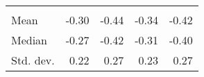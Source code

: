 \begin{tabular}{lllll}
  \multicolumn{1}{|r}{} &
  \multicolumn{1}{r}{} &
  \multicolumn{1}{r}{} &
  \multicolumn{1}{r}{} \\
\multicolumn{1}{l}{\hspace{2em}Mean} &
  \multicolumn{1}{|r}{-0.30} &
  \multicolumn{1}{r}{-0.44} &
  \multicolumn{1}{r}{-0.34} &
  \multicolumn{1}{r}{-0.42} \\
\multicolumn{1}{l}{\hspace{2em}Median} &
  \multicolumn{1}{|r}{-0.27} &
  \multicolumn{1}{r}{-0.42} &
  \multicolumn{1}{r}{-0.31} &
  \multicolumn{1}{r}{-0.40} \\
\multicolumn{1}{l}{\hspace{2em}Std. dev.} &
  \multicolumn{1}{|r}{0.22} &
  \multicolumn{1}{r}{0.27} &
  \multicolumn{1}{r}{0.23} &
  \multicolumn{1}{r}{0.27} \\
\cline{1-5}
\end{tabular}
